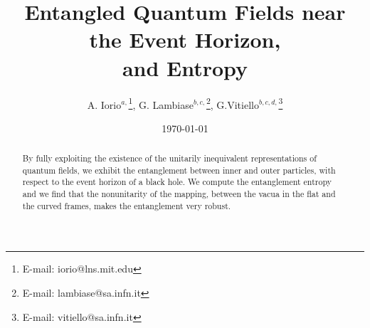 




 \renewcommand{\theequation}{\thesection.\arabic{equation}}
 \def\appendixa{
 \vskip 1cm
 {\bf APPENDIX A: Useful Algebraic Relations}
 \vskip 1cm
 \par
 \setcounter{equation}{0}
 \def\theequation{A.\arabic{equation}}
 }
 \def\appendixb{
 \vskip 1cm
 {\bf APPENDIX B: The Rindler Space-Time}
 \vskip 1cm
 \par
 \setcounter{equation}{0}
 \def\theequation{B.\arabic{equation}}
 }
 

 \title{Entangled Quantum Fields near the Event Horizon, \\
 and Entropy}
 \author{A. Iorio$^{a,}$\thanks{E-mail: iorio@lns.mit.edu},
 G. Lambiase$^{b,c,}$\thanks{E-mail: lambiase@sa.infn.it},
 G.Vitiello$^{b,c,d,}$\thanks{E-mail: vitiello@sa.infn.it} }
  \address{$^a$ Center for Theoretical Physics, Massachusetts Institute of Technology, \\
   Cambridge, MA 02139-4307, USA  \\
   and INFN, Rome, Italy}
  \address{$^b$Dipartimento di Fisica "E.R.Caianiello"
  Universit\`a di Salerno, 84081 Baronissi (SA), Italy}
  \address{$^c$INFN, Gruppo Collegato di Salerno}
  \address{$^d$INFM, Salerno, Italy}
 \date{\today}
 \maketitle
\begin{abstract}
\noindent By fully exploiting the existence of the unitarily
inequivalent representations of quantum fields, we exhibit the
entanglement between inner and outer particles, with respect to
the event horizon of a black hole. We compute the entanglement
entropy and we find that the nonunitarity of the mapping, between
the vacua in the flat and the curved frames, makes the
entanglement very robust.
\end{abstract}

